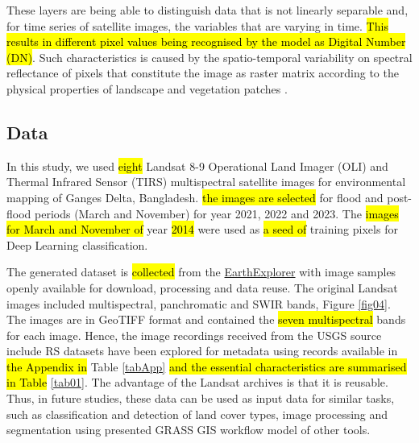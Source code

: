 \documentclass[water,article,submit,pdftex,moreauthors]{Definitions/mdpi}
\begin{document}
These layers are being able to distinguish data that is not linearly separable and, for time series of satellite images, the variables that are varying in time. \hl{This results in different pixel values being recognised by the model as Digital Number (DN)}. Such characteristics is caused by the spatio-temporal variability on spectral reflectance of pixels that constitute the image as raster matrix according to the physical properties of landscape and vegetation patches \cite{rs16010184,HUANG20181915,YIN2021102514}. 

\subsection{Data}
In this study, we used \hl{eight} Landsat 8-9 Operational Land Imager (OLI) and Thermal Infrared Sensor (TIRS) multispectral satellite images for environmental mapping of Ganges Delta, Bangladesh. \hl{the images are selected} for flood and post-flood periods (March and November) for year 2021, 2022 and 2023. The \hl{images for March and November of} year \hl{2014} were used as \hl{a seed of} training pixels for Deep Learning classification. 

The generated dataset is \hl{collected} from the \href{https://earthexplorer.usgs.gov/}{EarthExplorer} \cite{USGSPublication} with image samples openly available for download, processing and data reuse. The original Landsat images included multispectral, panchromatic and SWIR bands, Figure \ref{fig04}. The images are in GeoTIFF format and contained the \hl{seven multispectral} bands for each image. Hence, the image recordings received from the USGS source include RS datasets have been explored for metadata using records available in \hl{the Appendix in }Table \ref{tabApp} \hl{and the essential characteristics are summarised in Table} \ref{tab01}. The advantage of the Landsat archives is that it is reusable. Thus, in future studies, these data can be used as input data for similar tasks, such as classification and detection of land cover types, image processing and segmentation using presented GRASS GIS workflow model of other tools. 
\end{document}
